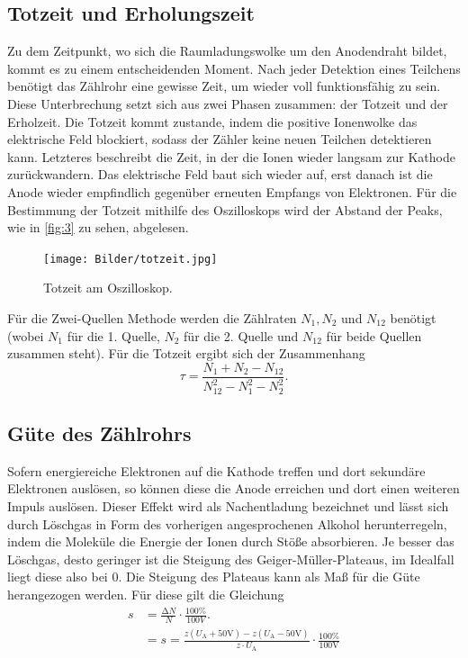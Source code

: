 \subsection{Totzeit und Erholungszeit}
Zu dem Zeitpunkt, wo sich die Raumladungswolke um den Anodendraht bildet, kommt 
es zu einem entscheidenden Moment. Nach jeder Detektion eines Teilchens benötigt
das Zählrohr eine gewisse Zeit, um wieder voll funktionsfähig zu sein. Diese
Unterbrechung setzt sich aus zwei Phasen zusammen: der Totzeit und der Erholzeit.
Die Totzeit kommt zustande, indem die positive Ionenwolke das elektrische Feld 
blockiert, sodass der Zähler keine neuen Teilchen detektieren kann. Letzteres 
beschreibt die Zeit, in der die Ionen wieder langsam zur Kathode zurückwandern. 
Das elektrische Feld baut sich wieder auf, erst danach ist die Anode wieder 
empfindlich gegenüber erneuten Empfangs von Elektronen. Für die Bestimmung der 
Totzeit mithilfe des Oszilloskops wird der Abstand der Peaks, wie in \autoref{fig:3}
zu sehen, abgelesen.
\begin{figure}[H]
    \centering
        \centering
        \texttt{[image: Bilder/totzeit.jpg]}
        \caption{Totzeit am Oszilloskop.}
    \hfill
    \label{fig:3}
\end{figure}
\noindent Für die Zwei-Quellen Methode werden die Zählraten $N_1, N_2$ und 
$N_{12}$ benötigt (wobei $N_1$ für die 1. Quelle, $N_2$ für die 2. Quelle und 
$N_{12}$ für beide Quellen zusammen steht). Für die Totzeit ergibt sich der 
Zusammenhang
\begin{equation}
    \tau = \frac{N_1 + N_2 - N_{12}}{N_{12}^2 - N_1^2 -N_2^2}.
\end{equation}

\subsection{Güte des Zählrohrs}
Sofern energiereiche Elektronen auf die Kathode treffen und dort sekundäre 
Elektronen auslösen, so können diese die Anode erreichen und dort einen 
weiteren Impuls auslösen. Dieser Effekt wird als Nachentladung bezeichnet und 
lässt sich durch Löschgas in Form des vorherigen angesprochenen Alkohol 
herunterregeln, indem die Moleküle die Energie der Ionen durch Stöße absorbieren.
Je besser das Löschgas, desto geringer ist die Steigung des Geiger-Müller-Plateaus, 
im Idealfall liegt diese also bei 0. Die Steigung des Plateaus kann als Maß 
für die Güte herangezogen werden. Für diese gilt die Gleichung 
\begin{align}
    s &= \frac{\increment N}{N} \cdot \frac{100\%}{100V}.\\
      &= s = \frac{z\left(U_\text{A} + 50\unit{\volt}\right) - z\left(U_\text{A} - 50\unit{\volt}\right)}{z \cdot U_\text{A}} \cdot \frac{100\%}{100\unit{\volt}}
\end{align} 

